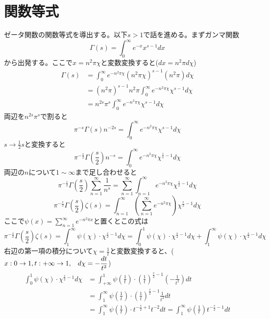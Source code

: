 \documentclass{jsarticle}
\begin{document}
\section{関数等式}
ゼータ関数の関数等式を導出する。以下\(s>1\)で話を進める。まずガンマ関数
\[\Gamma(s)=\int_{0}^{\infty}e^{-x}x^{s-1}dx\]
から出発する。ここで\(x=n^2\pi\chi\)と変数変換すると(\(dx=n^2\pi d\chi\))
\begin{align*}
\Gamma(s)&=\int_{0}^{\infty}e^{-n^2\pi\chi}(n^2\pi\chi)^{s-1}(n^2\pi)d\chi\\
&=(n^2\pi)^{s-1}n^2\pi\int_{0}^{\infty}e^{-n^2\pi\chi}\chi^{s-1}d\chi\\
&=n^{2s}\pi^{s}\int_{0}^{\infty}e^{-n^2\pi\chi}\chi^{s-1}d\chi
\end{align*}
両辺を\(n^{2s}\pi^{s}\)で割ると
\[\pi^{-s}\Gamma(s)n^{-2s}=\int_{0}^{\infty}e^{-n^2\pi\chi}\chi^{s-1}d\chi\]
\(s\to\frac{1}{2}s\)と変換すると
\[\pi^{-\frac{s}{2}}\Gamma\left(\frac{s}{2}\right)n^{-s}=\int_{0}^{\infty}e^{-n^2\pi\chi}\chi^{\frac{1}{s}-1}d\chi\]
両辺の\(n\)について\(1\sim\infty\)まで足し合わせると
\[\pi^{-\frac{s}{2}}\Gamma\left(\frac{s}{2}\right)\sum_{n=1}^{\infty}\frac{1}{n^s}=\sum_{n=1}^{\infty}\int_{n=1}^{\infty}e^{-n^{2}\pi\chi}\chi^{\frac{s}{2}-1}d\chi\]
\[\pi^{-\frac{s}{2}}\Gamma\left(\frac{s}{2}\right)\zeta(s)=\int_{n=1}^{\infty}\left(\sum_{n=1}^{\infty}e^{-n^{2}\pi\chi}\right)\chi^{\frac{s}{2}-1}d\chi\]
ここで\(\displaystyle\psi(x)=\sum_{n=1}^{\infty}e^{-n^{2}\pi x}\)と置くとこの式は
\begin{equation}
\pi^{-\frac{s}{2}}\Gamma\left(\frac{s}{2}\right)\zeta(s)=\int_{1}^{\infty}\psi(\chi)\cdot\chi^{\frac{s}{2}-1}d\chi
=\int_{0}^{1}\psi(\chi)\cdot\chi^{\frac{s}{2}-1}d\chi+\int_{1}^{\infty}\psi(\chi)\cdot\chi^{\frac{s}{2}-1}d\chi
\end{equation}
右辺の第一項の積分について\(\chi=\frac{1}{t}\)と変数変換すると、(\(\displaystyle x:0\to1,t:+\infty\to1,\hspace{3mm}d\chi=-\frac{dt}{t^2}\))
\begin{align*}
\int_{0}^{1}\psi(\chi)\cdot\chi^{\frac{s}{2}-1}d\chi&=\int_{+\infty}^{1}\psi\left(\frac{1}{t}\right)\cdot\left(\frac{1}{t}\right)^{\frac{s}{2}-1}\left(-\frac{1}{t^2}\right)dt\\
&=\int_{1}^{\infty}\psi\left(\frac{1}{t}\right)\cdot\left(\frac{1}{t}\right)^{\frac{s}{2}-1}\frac{1}{t^2}dt\\
&=\int_{1}^{\infty}\psi\left(\frac{1}{t}\right)\cdot t^{-\frac{s}{2}+1}t^{-2}dt=\int_{1}^{\infty}\psi\left(\frac{1}{t}\right)t^{-\frac{s}{2}-1}dt
\end{align*}
\end{document}
